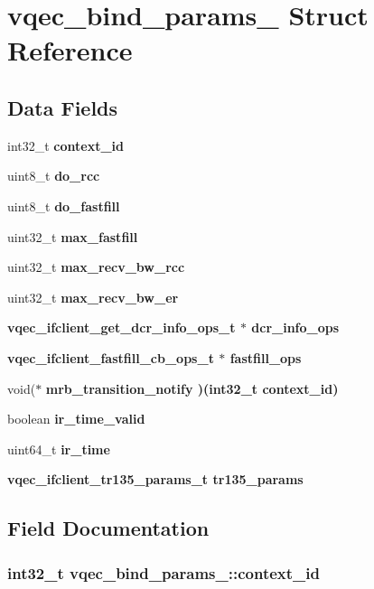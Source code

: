 \section{vqec\_\-bind\_\-params\_\- Struct Reference}
\label{structvqec__bind__params__}
\subsection*{Data Fields}
\begin{CompactItemize}
\item 
int32\_\-t \bf{context\_\-id}
\item 
uint8\_\-t \bf{do\_\-rcc}
\item 
uint8\_\-t \bf{do\_\-fastfill}
\item 
uint32\_\-t \bf{max\_\-fastfill}
\item 
uint32\_\-t \bf{max\_\-recv\_\-bw\_\-rcc}
\item 
uint32\_\-t \bf{max\_\-recv\_\-bw\_\-er}
\item 
\bf{vqec\_\-ifclient\_\-get\_\-dcr\_\-info\_\-ops\_\-t} $\ast$ \bf{dcr\_\-info\_\-ops}
\item 
\bf{vqec\_\-ifclient\_\-fastfill\_\-cb\_\-ops\_\-t} $\ast$ \bf{fastfill\_\-ops}
\item 
void($\ast$ \bf{mrb\_\-transition\_\-notify} )(int32\_\-t \bf{context\_\-id})
\item 
boolean \bf{ir\_\-time\_\-valid}
\item 
uint64\_\-t \bf{ir\_\-time}
\item 
\bf{vqec\_\-ifclient\_\-tr135\_\-params\_\-t} \bf{tr135\_\-params}
\end{CompactItemize}


\subsection{Field Documentation}
\subsubsection{\setlength{\rightskip}{0pt plus 5cm}int32\_\-t \bf{vqec\_\-bind\_\-params\_\-::context\_\-id}}\label{structvqec__bind__params___0f3dd2dd7d5cc31564c93fc7ba6bbe42}


